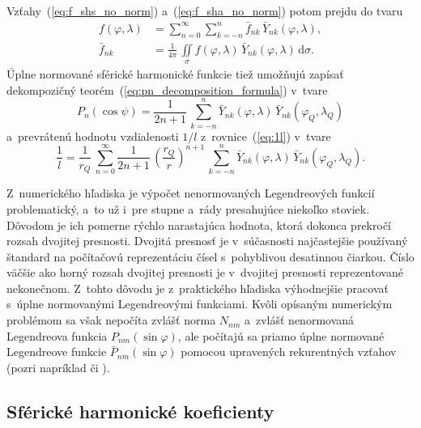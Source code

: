 \documentclass[a4paper,12pt]{book}
\newcommand{\diff}{\mathrm d}
\begin{document}
Vzťahy~(\ref{eq:f_shs_no_norm}) a~(\ref{eq:f_sha_no_norm}) potom prejdu do
tvaru
%
\begin{align}
\label{eq:f_shs}
f(\varphi, \lambda) &= \sum_{n = 0}^\infty \sum_{k = -n}^n \bar{f}_{nk} \,
\bar{Y}_{nk}(\varphi, \lambda){,}\\
%
\label{eq:f_sha}
\bar{f}_{nk} &= \frac{1}{4\pi} \, \iint\limits_{\sigma} f(\varphi, \lambda) \,
\bar{Y}_{nk}(\varphi, \lambda) \, \diff \sigma{.}
\end{align}
%
Úplne normované sférické harmonické funkcie tiež umožňujú zapísať dekompozičný
teorém~(\ref{eq:pn_decomposition_formula}) v~tvare
\parencite{MoritzPhysicalGeodesy}
%
\begin{equation}
P_n(\cos\psi) = \frac{1}{2n + 1} \, \sum_{k = -n}^n \bar{Y}_{nk}(\varphi,
\lambda) \, \bar{Y}_{nk}(\varphi_Q, \lambda_Q)
\end{equation}
%
a~prevrátenú hodnotu vzdialenosti $1 \slash l$ z~rovnice~(\ref{eq:1l}) v~tvare
%
\begin{equation}
\label{eq:1l_sh}
\frac{1}{l} = \frac{1}{r_Q} \, \sum_{n = 0}^{\infty} \frac{1}{2n + 1} \, \left( 
\frac{r_Q}{r} \right)^{n + 1} \, \sum_{k = -n}^n \bar{Y}_{nk}(\varphi,
\lambda) \, \bar{Y}_{nk}(\varphi_Q, \lambda_Q){.}
\end{equation}
%

Z~numerického hľadiska je výpočet nenormovaných Legendreových funkcií 
problematický, a~to už i~pre stupne a~rády presahujúce niekoľko stoviek.  
Dôvodom je ich pomerne rýchlo narastajúca hodnota, ktorá dokonca prekročí 
rozsah dvojitej presnosti.  Dvojitá presnosť je v~súčasnosti najčastejšie 
používaný štandard na počítačovú reprezentáciu čísel s~pohyblivou desatinnou 
čiarkou.  Číslo väčšie ako horný rozsah dvojitej presnosti je v~dvojitej 
presnosti reprezentované nekonečnom.  Z~tohto dôvodu je z~praktického hľadiska 
výhodnejšie pracovať s~úplne normovanými Legendreovými funkciami.  Kvôli 
opísaným numerickým problémom sa však nepočíta zvlášť norma $N_{nm}$ a~zvlášť 
nenormovaná Legendreova funkcia $P_{nm}(\sin\varphi)$, ale počítajú sa priamo 
úplne normované Legendreove funkcie $\bar{P}_{nm}(\sin\varphi)$ pomocou 
upravených rekurentných vzťahov (pozri napríklad \cite{Holmes2002a} či 
\cite{Fukushima2012a}).



\subsection{Sférické harmonické koeficienty}
\label{sec:shc_norm}
\end{document}
